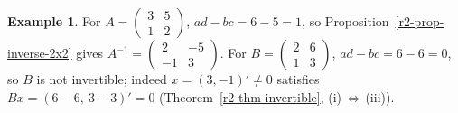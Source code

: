 \documentclass[12pt]{article}
\theoremstyle{definition}
\newtheorem{example}[theorem]{Example}
\begin{document}
\begin{example}\label{r2-exm-inverse-2x2}
For \(A=\left(\begin{smallmatrix}3&5\\1&2\end{smallmatrix}\right)\), \(ad-bc=6-5=1\), so
Proposition~\ref{r2-prop-inverse-2x2} gives
\(A^{-1}=\left(\begin{smallmatrix}2&-5\\-1&3\end{smallmatrix}\right)\). For
\(B=\left(\begin{smallmatrix}2&6\\1&3\end{smallmatrix}\right)\), \(ad-bc=6-6=0\), so \(B\) is
not invertible; indeed \(x=(3,-1)'\ne0\) satisfies \(Bx=(6-6,\ 3-3)'=0\)
(Theorem~\ref{r2-thm-invertible}, (i)\,\(\Leftrightarrow\)\,(iii)).
\end{example}
\end{document}
